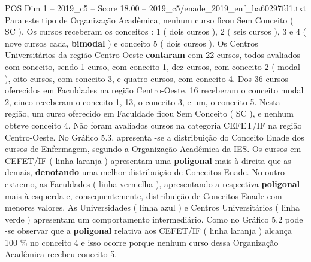 \begin{textsample}{POS Dim 1 – 2019\_c5 – Score 18.00 – 2019\_c5/enade\_2019\_enf\_ba60297fd1.txt}
Para este tipo de Organização Acadêmica, nenhum curso ficou Sem Conceito ( SC ).
Os cursos receberam os conceitos : 1 ( dois cursos ), 2 ( seis cursos ), 3 e 4 ( nove cursos cada, \textbf{bimodal} ) e conceito 5 ( dois cursos ).
Os Centros Universitários da região Centro-Oeste \textbf{contaram} com 22 cursos, todos avaliados com conceito, sendo 1 curso, com conceito 1, dez cursos, com conceito 2 ( modal ), oito cursos, com conceito 3, e quatro cursos, com conceito 4.
Dos 36 cursos oferecidos em Faculdades na região Centro-Oeste, 16 receberam o conceito modal 2, cinco receberam o conceito 1, 13, o conceito 3, e um, o conceito 5.
Nesta região, um curso oferecido em Faculdade ficou Sem Conceito ( SC ), e nenhum obteve conceito 4.
Não foram avaliados cursos na categoria CEFET/IF na região Centro-Oeste.
No Gráfico 5.3, apresenta -se a distribuição do Conceito Enade dos cursos de Enfermagem, segundo a Organização Acadêmica da IES.
Os cursos em CEFET/IF ( linha laranja ) apresentam uma \textbf{poligonal} mais à direita que as demais, \textbf{denotando} uma melhor distribuição de Conceitos Enade.
No outro extremo, as Faculdades ( linha vermelha ), apresentando a respectiva \textbf{poligonal} mais à esquerda e, consequentemente, distribuição de Conceitos Enade com menores valores.
As Universidades ( linha azul ) e Centros Universitários ( linha verde ) apresentam um comportamento intermediário.
Como no Gráfico 5.2 pode -se observar que a \textbf{poligonal} relativa aos CEFET/IF ( linha laranja ) alcança 100 \% no conceito 4 e isso ocorre porque nenhum curso dessa Organização Acadêmica recebeu conceito 5.

\end{textsample}
